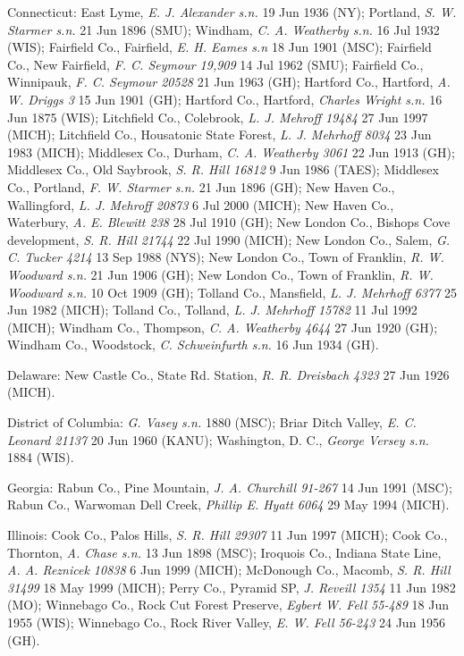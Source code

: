 \documentclass{article}
\begin{document}
Connecticut:
East Lyme, \textit{E. J. Alexander s.n.} 19 Jun 1936 (NY);
Portland, \textit{S. W. Starmer s.n.} 21 Jun 1896 (SMU);
Windham, \textit{C. A. Weatherby s.n.} 16 Jul 1932 (WIS);
Fairfield Co., Fairfield, \textit{E. H. Eames s.n} 18 Jun 1901 (MSC);
Fairfield Co., New Fairfield, \textit{F. C. Seymour 19,909} 14 Jul 1962 (SMU);
Fairfield Co., Winnipauk, \textit{F. C. Seymour 20528} 21 Jun 1963 (GH);
Hartford Co., Hartford, \textit{A. W. Driggs 3} 15 Jun 1901 (GH);
Hartford Co., Hartford, \textit{Charles Wright s.n.} 16 Jun 1875 (WIS);
Litchfield Co., Colebrook, \textit{L. J. Mehroff 19484} 27 Jun 1997 (MICH);
Litchfield Co., Housatonic State Forest, \textit{L. J. Mehrhoff 8034} 23 Jun 1983 (MICH);
Middlesex Co., Durham, \textit{C. A. Weatherby 3061} 22 Jun 1913 (GH);
Middlesex Co., Old Saybrook, \textit{S. R. Hill 16812} 9 Jun 1986 (TAES);
Middlesex Co., Portland, \textit{F. W. Starmer s.n.} 21 Jun 1896 (GH);
New Haven Co., Wallingford, \textit{L. J. Mehroff 20873} 6 Jul 2000 (MICH);
New Haven Co., Waterbury, \textit{A. E. Blewitt 238} 28 Jul 1910 (GH);
New London Co., Bishops Cove development, \textit{S. R. Hill 21744} 22 Jul 1990 (MICH);
New London Co., Salem, \textit{G. C. Tucker 4214} 13 Sep 1988 (NYS);
New London Co., Town of Franklin, \textit{R. W. Woodward s.n.} 21 Jun 1906 (GH);
New London Co., Town of Franklin, \textit{R. W. Woodward s.n.} 10 Oct 1909 (GH);
Tolland Co., Mansfield, \textit{L. J. Mehrhoff 6377} 25 Jun 1982 (MICH);
Tolland Co., Tolland, \textit{L. J. Mehrhoff 15782} 11 Jul 1992 (MICH);
Windham Co., Thompson, \textit{C. A. Weatherby 4644} 27 Jun 1920 (GH);
Windham Co., Woodstock, \textit{C. Schweinfurth s.n.} 16 Jun 1934 (GH).

Delaware:
New Castle Co., State Rd. Station, \textit{R. R. Dreisbach 4323} 27 Jun 1926 (MICH).

District of Columbia:
\textit{G. Vasey s.n.} 1880 (MSC);
Briar Ditch Valley, \textit{E. C. Leonard 21137} 20 Jun 1960 (KANU);
Washington, D. C., \textit{George Versey s.n.} 1884 (WIS).

Georgia:
Rabun Co., Pine Mountain, \textit{J. A. Churchill 91-267} 14 Jun 1991 (MSC);
Rabun Co., Warwoman Dell Creek, \textit{Phillip E. Hyatt 6064} 29 May 1994 (MICH).

Illinois:
Cook Co., Palos Hills, \textit{S. R. Hill 29307} 11 Jun 1997 (MICH);
Cook Co., Thornton, \textit{A. Chase s.n.} 13 Jun 1898 (MSC);
Iroquois Co., Indiana State Line, \textit{A. A. Reznicek 10838} 6 Jun 1999 (MICH);
McDonough Co., Macomb, \textit{S. R. Hill 31499} 18 May 1999 (MICH);
Perry Co., Pyramid SP, \textit{J. Reveill 1354} 11 Jun 1982 (MO);
Winnebago Co., Rock Cut Forest Preserve, \textit{Egbert W. Fell 55-489} 18 Jun 1955 (WIS);
Winnebago Co., Rock River Valley, \textit{E. W. Fell 56-243} 24 Jun 1956 (GH).
\end{document}
